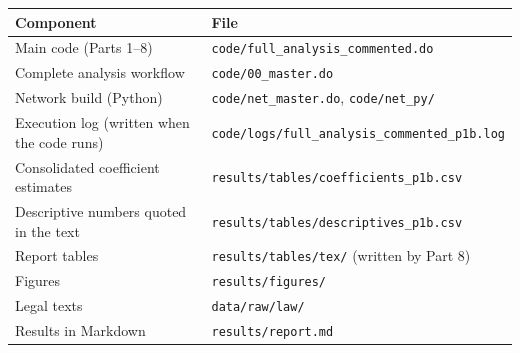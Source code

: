 \documentclass[11pt,a4paper]{article}
\newcommand{\code}[1]{\texttt{\small #1}}
\begin{document}
\begin{table}[H]
\centering\small
\begin{tabularx}{\textwidth}{>{\raggedright}p{5cm}>{\raggedright\arraybackslash}X}
\toprule
Component & File \\
\midrule
Main code (Parts 1--8) & \code{code/full\_analysis\_commented.do} \\
Complete analysis workflow & \code{code/00\_master.do} \\
Network build (Python) & \code{code/net\_master.do}, \code{code/net\_py/} \\
Execution log (written when the code runs) & \code{code/logs/full\_analysis\_commented\_p1b.log} \\
Consolidated coefficient estimates & \code{results/tables/coefficients\_p1b.csv} \\
Descriptive numbers quoted in the text & \code{results/tables/descriptives\_p1b.csv} \\
Report tables & \code{results/tables/tex/} (written by Part 8) \\
Figures & \code{results/figures/} \\
Legal texts & \code{data/raw/law/} \\
Results in Markdown & \code{results/report.md} \\
\bottomrule
\end{tabularx}
\end{table}
\end{document}
